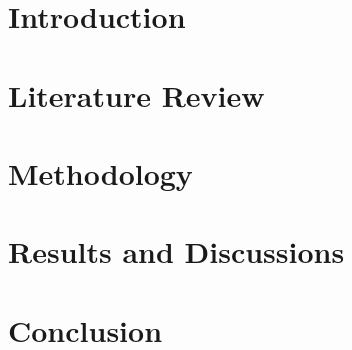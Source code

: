 \documentclass{cuetcsethesis}
\begin{document}

\maketitle

\certification







\thesisTables

\thesisBodyStart

\chapter{Introduction}


\chapter{Literature Review}


\chapter{Methodology}


\chapter{Results and Discussions}


\chapter{Conclusion}



\printReferences
\end{document}
